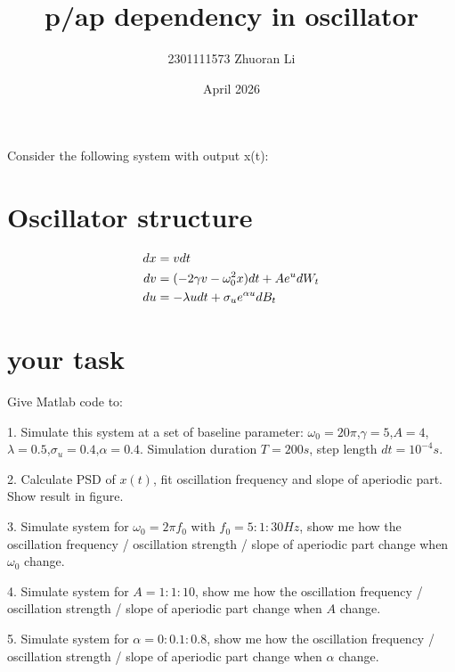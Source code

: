 \documentclass{article}
\title{p/ap dependency in oscillator}
\author{2301111573 Zhuoran Li}
\date{April 2026}
\begin{document}
	\maketitle
	Consider the following system with output x(t):
	\section{Oscillator structure}
	\begin{align}
		dx&=vdt\notag\\
		dv&=(-2\gamma v-\omega_0^2x)dt+Ae^{u}dW_t\notag\\
		du&=-\lambda udt+\sigma_ue^{\alpha u}dB_t
	\end{align}
	\section{your task}
	Give Matlab code to: 
	
	1. Simulate this system at a set of baseline parameter: $\omega_0=20\pi$,$\gamma=5$,$A=4$,$\lambda=0.5$,$\sigma_u=0.4$,$\alpha=0.4$. Simulation duration $T=200s$, step length $dt=10^{-4}s$.
	
	2. Calculate PSD of $x(t)$, fit oscillation frequency and slope of aperiodic part. Show result in figure.
	
	3. Simulate system for $\omega_0=2\pi f_0$ with $f_0=5:1:30Hz$, show me how the oscillation frequency / oscillation strength / slope of aperiodic part change when $\omega_0$ change.
	  
	4. Simulate system for $A=1:1:10$, show me how the oscillation frequency / oscillation strength / slope of aperiodic part change when $A$ change.
	
	5. Simulate system for $\alpha=0:0.1:0.8$, show me how the oscillation frequency / oscillation strength / slope of aperiodic part change when $\alpha$ change.
	
	
	
\end{document}
